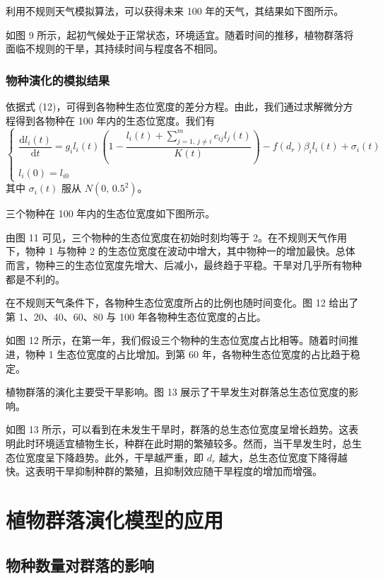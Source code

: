 \documentclass[11pt,a4paper]{ctexart}
\begin{document}
利用不规则天气模拟算法，可以获得未来 100 年的天气，其结果如下图所示。

如图 9 所示，起初气候处于正常状态，环境适宜。随着时间的推移，植物群落将面临不规则的干旱，其持续时间与程度各不相同。

\subsubsection{物种演化的模拟结果}

依据式 (12)，可得到各物种生态位宽度的差分方程。由此，我们通过求解微分方程得到各物种在 100 年内的生态位宽度。我们有
\begin{equation}
\begin{cases}
\dfrac{\mathrm{d}l_i(t)}{\mathrm{d}t}=g_i l_i(t)\left(1-\dfrac{l_i(t)+\sum_{j=1,\,j\neq i}^{m}c_{ij}l_j(t)}{K(t)}\right)-f(d_r)\beta_i l_i(t)+\sigma_i(t)\\[1.2em]
l_i(0)=l_{i0}
\end{cases}
\end{equation}
其中 $\sigma_i(t)$ 服从 $N(0,\,0.5^2)$。

三个物种在 100 年内的生态位宽度如下图所示。

由图 11 可见，三个物种的生态位宽度在初始时刻均等于 2。在不规则天气作用下，物种 1 与物种 2 的生态位宽度在波动中增大，其中物种一的增加最快。总体而言，物种三的生态位宽度先增大、后减小，最终趋于平稳。干旱对几乎所有物种都是不利的。

在不规则天气条件下，各物种生态位宽度所占的比例也随时间变化。图 12 给出了第 1、20、40、60、80 与 100 年各物种生态位宽度的占比。

如图 12 所示，在第一年，我们假设三个物种的生态位宽度占比相等。随着时间推进，物种 1 生态位宽度的占比增加。到第 60 年，各物种生态位宽度的占比趋于稳定。

植物群落的演化主要受干旱影响。图 13 展示了干旱发生对群落总生态位宽度的影响。

如图 13 所示，可以看到在未发生干旱时，群落的总生态位宽度呈增长趋势。这表明此时环境适宜植物生长，种群在此时期的繁殖较多。然而，当干旱发生时，总生态位宽度呈下降趋势。此外，干旱越严重，即 $d_r$ 越大，总生态位宽度下降得越快。这表明干旱抑制种群的繁殖，且抑制效应随干旱程度的增加而增强。

\section{植物群落演化模型的应用}

\subsection{物种数量对群落的影响}
\end{document}
